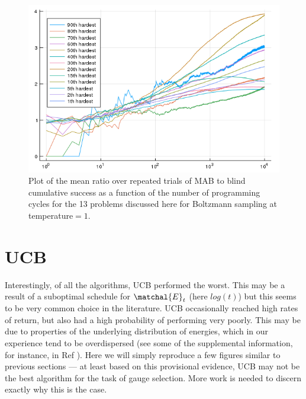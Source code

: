 \begin{figure}
    \includegraphics[width=0.8\columnwidth]{boltzmann_air_mabratio_mean.png}
    \caption{Plot of the mean ratio over repeated trials of MAB to blind cumulative success as a function of the number of programming cycles for the 13 problems discussed here for Boltzmann sampling at temperature$=1$.}
    \label{fig:boltzmann_air_mabratio_mean}
\end{figure}

\section{UCB}

Interestingly, of all the algorithms, UCB performed the worst. This may be a result of a suboptimal schedule for $\matchal{E}_t$ (here $log(t)$) but this seems to be  very common choice in the literature. UCB occasionally reached high rates of return, but also had a high probability of performing very poorly. This may be due to properties of the underlying distribution of energies, which in our experience tend to be overdispersed (see some of the supplemental information, for instance, in Ref \cite{higgs_qa}). Here we will simply reproduce a few figures similar to previous sections --- at least based on this provisional evidence, UCB may not be the best algorithm for the task of gauge selection. More work is needed to discern exactly why this is the case.

